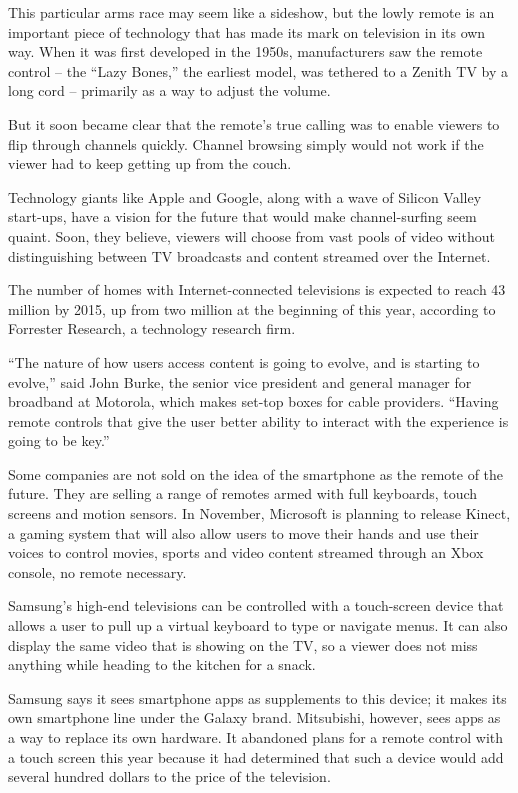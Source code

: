 ﻿\documentclass[12pt]{article}
\begin{document}
This particular arms race may seem like a sideshow, but the lowly remote is an important piece of
technology that has made its mark on television in its own way. When it was first developed in the
1950s, manufacturers saw the remote control -- the ``Lazy Bones,'' the earliest model, was tethered
to a Zenith TV by a long cord -- primarily as a way to adjust the volume.

But it soon became clear that the remote's true calling was to enable viewers to flip through
channels quickly. Channel browsing simply would not work if the viewer had to keep getting up from
the couch.

Technology giants like Apple and Google, along with a wave of Silicon Valley start-ups, have a
vision for the future that would make channel-surfing seem quaint. Soon, they believe, viewers will
choose from vast pools of video without distinguishing between TV broadcasts and content streamed
over the Internet.

The number of homes with Internet-connected televisions is expected to reach 43 million by 2015, up
from two million at the beginning of this year, according to Forrester Research, a technology
research firm.

``The nature of how users access content is going to evolve, and is starting to evolve,'' said John
Burke, the senior vice president and general manager for broadband at Motorola, which makes set-top
boxes for cable providers. ``Having remote controls that give the user better ability to interact
with the experience is going to be key.''

Some companies are not sold on the idea of the smartphone as the remote of the future. They are
selling a range of remotes armed with full keyboards, touch screens and motion sensors. In November,
Microsoft is planning to release Kinect, a gaming system that will also allow users to move their
hands and use their voices to control movies, sports and video content streamed through an Xbox
console, no remote necessary.

Samsung's high-end televisions can be controlled with a touch-screen device that allows a user to
pull up a virtual keyboard to type or navigate menus. It can also display the same video that is
showing on the TV, so a viewer does not miss anything while heading to the kitchen for a snack.

Samsung says it sees smartphone apps as supplements to this device; it makes its own smartphone line
under the Galaxy brand. Mitsubishi, however, sees apps as a way to replace its own hardware. It
abandoned plans for a remote control with a touch screen this year because it had determined that
such a device would add several hundred dollars to the price of the television.
\end{document}
